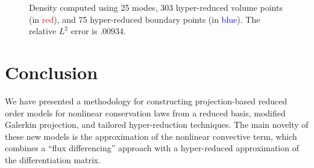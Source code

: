 \documentclass[preprint,10pt]{elsarticle}
\theoremstyle{definition}
\theoremstyle{lemma}
\theoremstyle{theorem}
\theoremstyle{assumption}
\begin{document}
\begin{figure}
\centering
{}
\hspace{.1em}
\hspace{.1em}
\caption{Density computed using 25 modes, 303 hyper-reduced volume points (in \textcolor{red}{red}), and 75 hyper-reduced boundary points (in \textcolor{blue}{blue}).  The relative $L^2$ error is $.00934$.}
\label{fig:pulse2d}
\end{figure}

\section{Conclusion}  We have presented a methodology for constructing projection-based reduced order models for nonlinear conservation laws from a reduced basis, modified Galerkin projection, and tailored hyper-reduction techniques.  The main novelty of these new models is the approximation of the nonlinear convective term, which combines a ``flux differencing'' approach with a hyper-reduced approximation of the differentiation matrix.  
\end{document}
